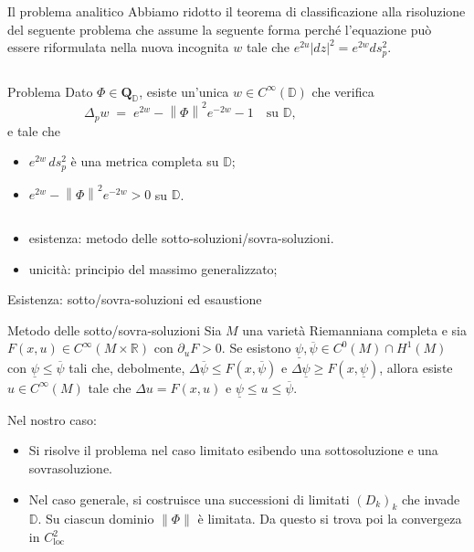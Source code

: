 \documentclass[aspectratio=169,11pt]{beamer}
\newcommand{\R}{\mathbb{R}}
\newcommand{\D}{\mathbb{D}}
\newcommand{\QDD}{\mathbf{Q}_{\D}}
\newcommand{\norm}[1]{\left\lVert #1 \right\rVert}
\begin{document}
\begin{frame}[t]{Il problema analitico}
	Abbiamo ridotto il teorema di classificazione alla risoluzione del seguente problema che assume la seguente forma perché l'equazione può essere riformulata nella nuova incognita $w$ tale che $e^{2u}|dz|^2 = e^{2w} ds_p^2$.

  \begin{columns}[T,onlytextwidth]
    \hfill
    \begin{block}{ Problema }
      Dato $\Phi\in\QDD$, esiste \alert{un'unica}
      $w\in C^\infty(\D)$ che verifica
      \[
        \Delta_p w \;=\; e^{2w}-\norm{\Phi}^2 e^{-2w}-1
        \quad\text{su } \D,
      \]
	  e tale che
      \begin{itemize}\itemsep=2pt
        \item $e^{2w}\,ds_p^2$ è una metrica completa su $\D$;
        \item $e^{2w}-\norm{\Phi}^2 e^{-2w} > 0$ su $\D$.    
      \end{itemize}
    \end{block}
    \hfill
  \end{columns}

  \vspace{3mm}
  \begin{itemize}
    \item \alert{esistenza}: metodo delle sotto-soluzioni/sovra-soluzioni.
    \item \alert{unicità}: principio del massimo generalizzato;
  \end{itemize}
\end{frame}

\begin{frame}[t]{Esistenza: sotto/sovra-soluzioni ed esaustione}

\begin{block}{Metodo delle sotto/sovra-soluzioni}
Sia \(M\) una varietà Riemanniana completa e sia \(F(x,u)\in C^\infty(M\times\R)\) con \(\partial_uF>0\).
Se esistono \(\underline\psi,\overline\psi\in C^0(M)\cap H^1(M)\) con \(\underline\psi\le \overline\psi\) tali che, debolmente,
\(\Delta \overline\psi \le F(x,\overline\psi)\) e \(\Delta \underline\psi \ge F(x,\underline\psi)\),
allora esiste \(u\in C^\infty(M)\) tale che \(\Delta u=F(x,u)\) e \(\underline\psi\le u\le \overline\psi\).
\end{block}

\vspace{1mm}

Nel nostro caso:
\begin{itemize}
	\item Si risolve il problema nel caso limitato esibendo una sottosoluzione e una sovrasoluzione.
  \item Nel caso generale, si costruisce una successioni di limitati $(D_k)_k$ che invade \(\D\). Su ciascun dominio $\|\Phi\|$ è limitata.  Da questo si trova poi la convergeza in $C^2_{\mathrm{loc}}$
\end{itemize}

\end{frame}
\end{document}
